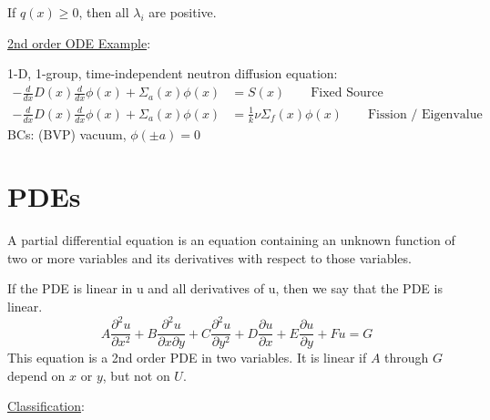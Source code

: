 \documentclass[12pt]{article}
\newcommand{\Macro}{\ensuremath{\Sigma}}
\begin{document}
If $q(x) \geq 0$, then all $\lambda_i$ are positive.

\vspace*{1em}
\noindent \underline{2nd order ODE Example}:

1-D, 1-group, time-independent neutron diffusion equation:
%
\begin{align}
-\frac{d}{dx}D(x)\frac{d}{dx}\phi(x) + \Macro_a(x)\phi(x) &= S(x) \qquad \text{Fixed Source} \nonumber \\
-\frac{d}{dx}D(x)\frac{d}{dx}\phi(x) + \Macro_a(x)\phi(x) &= \frac{1}{k} \nu \Macro_f(x) \phi(x)\qquad \text{Fission / Eigenvalue} \nonumber
\end{align}
%
BCs: (BVP) vacuum, $\phi(\pm a) = 0$

\section{PDEs}

A partial differential equation is an equation containing an unknown function of two or more variables and its derivatives with respect to those variables. 

If the PDE is linear in u and all derivatives of u, then we say that the PDE is linear.
%
\begin{equation}
A\frac{\partial^2 u}{\partial x^2} + B\frac{\partial^2 u}{\partial x \partial  y} + C\frac{\partial^2 u}{\partial y^2} + D\frac{\partial u}{\partial x} + E\frac{\partial u}{\partial y} + Fu = G \nonumber
\end{equation}
%
This equation is a 2nd order PDE in two variables. It is linear if $A$ through $G$ depend on $x$ or $y$, but not on $U$.

\vspace*{1em}
\noindent \underline{Classification}:
\end{document}
